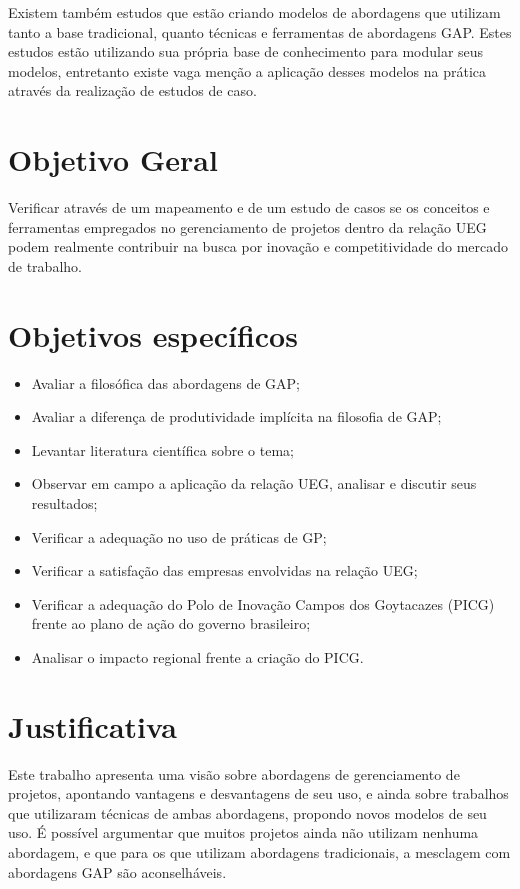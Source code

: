 Existem também estudos que estão criando modelos de abordagens que utilizam tanto a base tradicional, quanto técnicas e ferramentas de abordagens GAP. Estes estudos estão utilizando sua própria base de conhecimento para modular seus modelos, entretanto existe vaga menção a aplicação desses modelos na prática através da realização de estudos de caso.


\section{Objetivo Geral}

Verificar através de um mapeamento e de um estudo de casos se os conceitos e ferramentas empregados no gerenciamento de projetos dentro da relação UEG podem realmente contribuir na busca por inovação e competitividade do mercado de trabalho.


\section{Objetivos específicos}

\begin{itemize}
  \item{Avaliar a filosófica das abordagens de GAP;}
  \item{Avaliar a diferença de produtividade implícita na filosofia de GAP;}
  \item{Levantar literatura científica sobre o tema;}
  \item{Observar em campo a aplicação da relação UEG, analisar e discutir seus resultados;}
  \item{Verificar a adequação no uso de práticas de GP;}
  \item{Verificar a satisfação das empresas envolvidas na relação UEG;}
  \item{Verificar a adequação do Polo de Inovação Campos dos Goytacazes (PICG) frente ao plano de ação do governo brasileiro;}
  \item{Analisar o impacto regional frente a criação do PICG.}
\end{itemize}

\section{Justificativa}

Este trabalho apresenta uma visão sobre abordagens de gerenciamento de projetos, apontando vantagens e desvantagens de seu uso, e ainda sobre trabalhos que utilizaram técnicas de ambas abordagens, propondo novos modelos de seu uso. É possível argumentar que muitos projetos ainda não utilizam nenhuma abordagem, e que para os que utilizam abordagens tradicionais, a mesclagem com abordagens GAP são aconselháveis.

